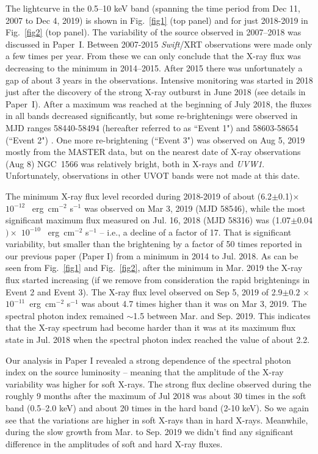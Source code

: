 \documentclass[fleqn,usenatbib]{mnras}
\begin{document}
The  lightcurve  in the 0.5--10 keV band (spanning the time period from Dec 11, 2007 to Dec 4, 2019) is shown in Fig.~\ref{fig1} (top panel) and for just 2018-2019 in Fig.~\ref{fig2} (top panel). The variability of the source observed in 2007--2018 was discussed in Paper~I.
Between 2007-2015 {\it Swift}/XRT observations were made only a few times per year. From these we can only conclude that the X-ray flux was decreasing to the minimum  in 2014--2015. After 2015 there was unfortunately a gap of about 3 years in the observations.  Intensive monitoring was started in 2018 just after the discovery of 
 the strong X-ray outburst in June 2018 (see details in Paper~I). After a maximum was reached at the beginning of July 2018, the fluxes in all bands decreased significantly, but  some re-brightenings were observed in MJD ranges 58440-58494 (hereafter referred to as ``Event 1") and 58603-58654 (``Event 2") \citep{Grupe2018b, Grupe2019}. One more re-brightening (``Event 3") was observed on Aug 5, 2019 mostly from the MASTER data, but on the nearest date of X-ray observations (Aug 8) NGC~1566 was relatively bright, both in X-rays and {\it UVW1}. Unfortunately, observations in other UVOT bands were not made at this date.

The minimum X-ray flux level recorded during 2018-2019 of about (6.2$\pm$0.1)$\times$ $10^{-12}$ ~erg~cm$^{-2}$ s$^{-1}$  was observed on Mar 3, 2019 (MJD 58546), while the most significant maximum flux measured on Jul. 16, 2018 (MJD 58316)  was (1.07$\pm$0.04$)\times$ $10^{-10}$ ~erg~cm$^{-2}$ s$^{-1}$ -- i.e., a decline of a factor of  17. That is significant variability, but smaller than the brightening by a factor of 50 times reported in our previous paper (Paper I) from a minimum in 2014 to Jul. 2018. As can be seen from Fig.~\ref{fig1} and Fig.~\ref{fig2}, after the minimum in Mar. 2019 the X-ray flux started increasing (if we remove from consideration the rapid brightenings in Event 2 and Event 3). The X-ray flux level observed on Sep 5, 2019 of 2.9$\pm0.2$ $\times$ $10^{-11}$~erg~cm$^{-2}$ s$^{-1}$ was about 4.7 times higher than it was on Mar 3, 2019. The spectral photon index remained $\sim$1.5 between Mar. and Sep. 2019. This indicates that the X-ray spectrum had become harder than it was at its maximum flux state in Jul. 2018 when the spectral photon index reached the value of about 2.2.

Our analysis in Paper I revealed a strong dependence of the spectral photon index on the source luminosity -- meaning that the amplitude of the X-ray variability was higher for soft X-rays.  The strong flux decline observed during the roughly 9 months after the maximum of Jul 2018 was about  30 times in the soft band (0.5--2.0 keV) and about  20 times in the hard band (2-10 keV). So we again see that the variations are higher in soft X-rays than in hard X-rays.  
Meanwhile, during the slow growth from Mar. to Sep.  2019 we didn't find any significant difference in the amplitudes of soft and hard X-ray fluxes.
\end{document}

